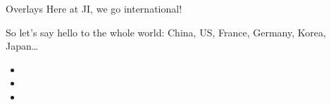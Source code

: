 \documentclass{beamer}
\begin{document}
\begin{frame}{Overlays}
Here at JI, we go international! \pause

So let's say hello to the whole world: China, US, France, Germany,
Korea, Japan…

\begin{itemize}
    \item<4-> 
    \item<3-> 
    \item<2-> 
\end{itemize}
\end{frame}
\end{document}
